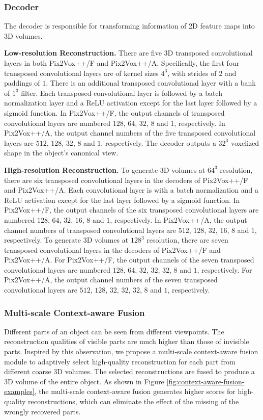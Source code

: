 \documentclass[twocolumn]{svjour3}
\begin{document}
\subsubsection{Decoder}

The decoder is responsible for transforming information of 2D feature maps into 3D volumes.

\noindent \textbf{Low-resolution Reconstruction.}
There are five 3D transposed convolutional layers in both Pix2Vox++/F and Pix2Vox++/A.
Specifically, the first four transposed convolutional layers are of kernel sizes $4^3$, with strides of $2$ and paddings of $1$.
There is an additional transposed convolutional layer with a bank of $1^3$ filter.
Each transposed convolutional layer is followed by a batch normalization layer and a ReLU activation except for the last layer followed by a sigmoid function.
In Pix2Vox++/F, the output channels of transposed convolutional layers are numbered $128$, $64$, $32$, $8$ and $1$, respectively.
In Pix2Vox++/A, the output channel numbers of the five transposed convolutional layers are $512$, $128$, $32$, $8$ and $1$, respectively.
The decoder outputs a $32^3$ voxelized shape in the object's canonical view.

\noindent \textbf{High-resolution Reconstruction.}
To generate 3D volumes at $64^3$ resolution, there are six transposed convolutional layers in the decoders of Pix2Vox++/F and Pix2Vox++/A.
Each convolutional layer is with a batch normalization and a ReLU activation except for the last layer followed by a sigmoid function.
In Pix2Vox++/F, the output channels of the six transposed convolutional layers are numbered $128$, $64$, $32$, $16$, $8$ and $1$, respectively.
In Pix2Vox++/A, the output channel numbers of transposed convolutional layers are $512$, $128$, $32$, $16$, $8$ and $1$, respectively.
To generate 3D volumes at $128^3$ resolution, there are seven transposed convolutional layers in the decoders of Pix2Vox++/F and Pix2Vox++/A.
For Pix2Vox++/F, the output channels of the seven transposed convolutional layers are numbered $128$, $64$, $32$, $32$, $32$, $8$ and $1$, respectively.
For Pix2Vox++/A, the output channel numbers of the seven transposed convolutional layers are $512$, $128$, $32$, $32$, $32$, $8$ and $1$, respectively.

\subsubsection{Multi-scale Context-aware Fusion}

Different parts of an object can be seen from different viewpoints.
The reconstruction qualities of visible parts are much higher than those of invisible parts.
Inspired by this observation, we propose a multi-scale context-aware fusion module to adaptively select high-quality reconstruction for each part from different coarse 3D volumes.
The selected reconstructions are fused to produce a 3D volume of the entire object.
As shown in Figure \ref{fig:context-aware-fusion-examples}, the multi-scale context-aware fusion generates higher scores for high-quality reconstructions, which can eliminate the effect of the missing of the wrongly recovered parts.
\end{document}
